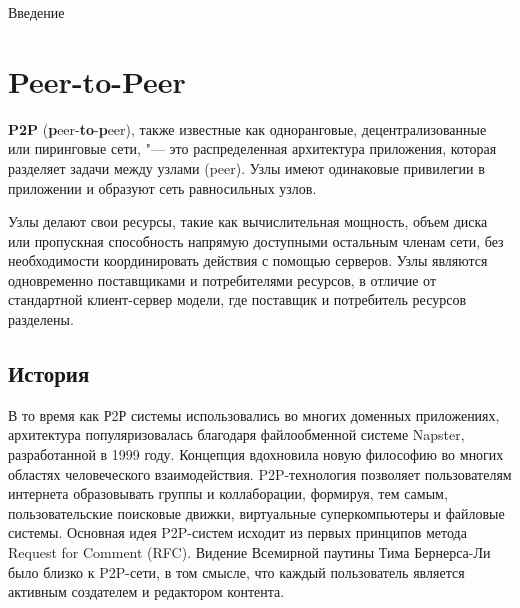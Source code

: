 \documentclass[bachelor, och, coursework]{SCWorks}
\begin{document}




\tableofcontents

\intro
Введение

\section{Peer-to-Peer} %
\textbf{P2P} (\textbf{p}eer-\textbf{to}-\textbf{p}eer), также известные как одноранговые, децентрализованные или пиринговые сети, 
"--- это распределенная архитектура приложения, которая разделяет задачи между узлами (peer). 
Узлы имеют одинаковые привилегии в приложении и образуют сеть равносильных узлов.

Узлы делают свои ресурсы, такие как вычислительная мощность, объем диска или пропускная способность напрямую доступными остальным членам сети, 
без необходимости координировать действия с помощью серверов. Узлы являются одновременно поставщиками и потребителями ресурсов, 
в отличие от стандартной клиент-сервер модели, где поставщик и потребитель ресурсов разделены. \cite{P2P_1}

\subsection{История}
В то время как Р2Р системы использовались во многих доменных приложениях, архитектура популяризовалась благодаря файлообменной системе Napster, 
разработанной в 1999 году. Концепция вдохновила новую философию во многих областях человеческого взаимодействия. 
P2P-технология позволяет пользователям интернета образовывать группы и коллаборации, формируя, тем самым, пользовательские поисковые движки, 
виртуальные суперкомпьютеры и файловые системы. Основная идея P2P-систем исходит из первых принципов метода Request for Comment (RFC). 
Видение Всемирной паутины Тима Бернерса-Ли было близко к P2P-сети, в том смысле, 
что каждый пользователь является активным создателем и редактором контента.
\end{document}

